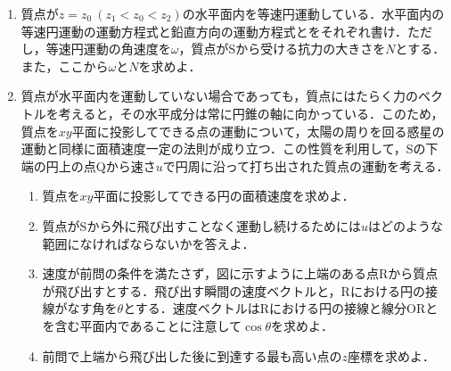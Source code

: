 \begin{enumerate}[I]
  \item {\hzw} 質点が$z = z_0\ (z_1 < z_0 < z_2)$の水平面内を等速円運動している．水平面内の等速円運動の運動方程式と鉛直方向の運動方程式とをそれぞれ書け．ただし，等速円運動の角速度を$\omega$，質点がSから受ける抗力の大きさを$N$とする．また，ここから$\omega$と$N$を求めよ．
  \item {\hzw}質点が水平面内を運動していない場合であっても，質点にはたらく力のベクトルを考えると，その水平成分は常に円錐の軸に向かっている．このため，質点を$xy$平面に投影してできる点の運動について，太陽の周りを回る惑星の運動と同様に面積速度一定の法則が成り立つ．この性質を利用して，Sの下端の円上の点Qから速さ$u$で円周に沿って打ち出された質点の運動を考える．
  \begin{enumerate}[(1)]
    \item {\hzw}質点を$xy$平面に投影してできる円の面積速度を求めよ．
    \item {\hzw}質点がSから外に飛び出すことなく運動し続けるためには$u$はどのような範囲になければならないかを答えよ．
    \item {\hzw}速度が前問の条件を満たさず，図に示すように上端のある点Rから質点が飛び出すとする．飛び出す瞬間の速度ベクトルと，Rにおける円の接線がなす角を$\theta$とする．速度ベクトルはRにおける円の接線と線分ORとを含む平面内であることに注意して$\cos\theta$を求めよ．
    \item {\hzw}前問で上端から飛び出した後に到達する最も高い点の$z$座標を求めよ．
  \end{enumerate}
\end{enumerate}
